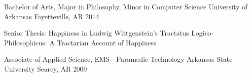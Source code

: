 
\begin{cventries}

  \cventry
  {Bachelor of Arts, Major in Philosophy, Minor in Computer Science} %
    {University of Arkansas} %
    {Fayetteville, AR} %
    {2014} %
    {
      \begin{cvitems} %
	{Senior Thesis: Happiness in Ludwig Wittgenstein’s Tractatus Logico-Philosophicus: A Tractarian Account of Happiness}
      \end{cvitems}
    }
  \cventry
  {Associate of Applied Science, EMS - Paramedic Technology} %
    {Arkansas State University} %
    {Searcy, AR} %
    {2009} %
    {
      \begin{cvitems} %
       {}
      \end{cvitems}
    }

\end{cventries}
